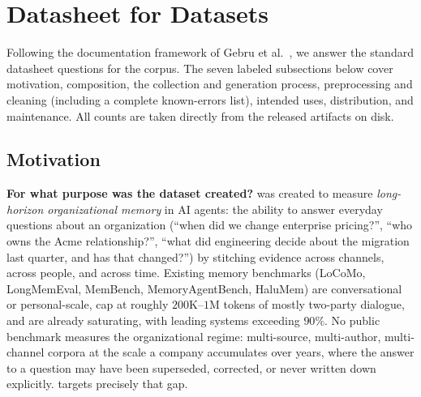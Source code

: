 
\section{Datasheet for Datasets}
\label{app:datasheet}

Following the documentation framework of Gebru et al.~\citep{gebru2021datasheets},
we answer the standard datasheet questions for the \bench{} corpus. The seven
labeled subsections below cover motivation, composition, the collection and
generation process, preprocessing and cleaning (including a complete known-errors
list), intended uses, distribution, and maintenance. All counts are taken
directly from the released artifacts on disk.

\subsection{Motivation}

\textbf{For what purpose was the dataset created?}
\bench{} was created to measure \emph{long-horizon organizational memory} in AI
agents: the ability to answer everyday questions about an organization
(``when did we change enterprise pricing?'', ``who owns the Acme relationship?'',
``what did engineering decide about the migration last quarter, and has that
changed?'') by stitching evidence across channels, across people, and across
time. Existing memory benchmarks (LoCoMo, LongMemEval, MemBench,
MemoryAgentBench, HaluMem) are conversational or personal-scale, cap at roughly
$200\text{K}$--$1\text{M}$ tokens of mostly two-party dialogue, and are already
saturating, with leading systems exceeding $90\%$. No public benchmark measures
the organizational regime: multi-source, multi-author, multi-channel corpora at
the scale a company accumulates over years, where the answer to a question may
have been superseded, corrected, or never written down explicitly. \bench{}
targets precisely that gap.

